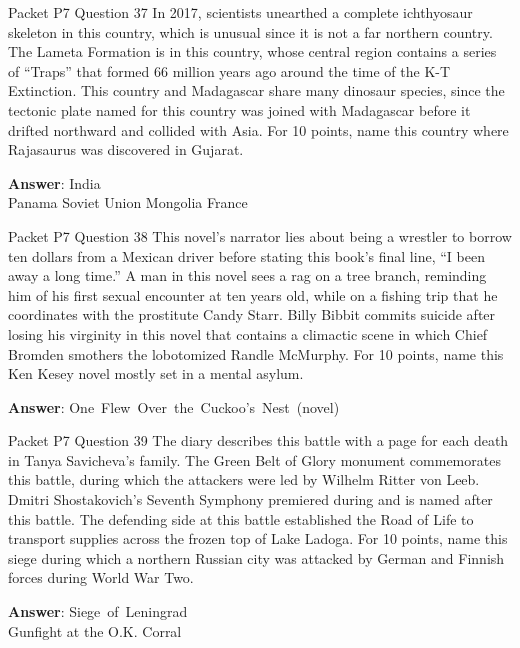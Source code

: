 \begin{frame}{Packet P7 Question 37}
In 2017, scientists unearthed a complete ichthyosaur skeleton in this country, which is unusual since it is not a far northern country. The Lameta Formation is in this country, whose central region contains a series of “Traps” that formed 66 million years ago around the time of the K-T Extinction. This country and Madagascar share many dinosaur species, since the tectonic plate named for this country was joined with Madagascar before it drifted northward and collided with Asia. For 10 points, name this country where Rajasaurus was discovered in Gujarat.        

\textbf{Answer}: India\\
 Panama
 Soviet Union
 Mongolia
 France
\end{frame}

\begin{frame}{Packet P7 Question 38}
This novel’s narrator lies about being a wrestler to borrow ten dollars from a Mexican driver before stating this book’s final line, “I been away a long time.” A man in this novel sees a rag on a tree branch, reminding him of his first sexual encounter at ten years old, while on a fishing trip that he coordinates with the prostitute Candy Starr. Billy Bibbit commits       suicide after   losing his virginity in this novel that contains a climactic scene in which Chief Bromden smothers the lobotomized Randle McMurphy. For 10 points, name this Ken Kesey novel mostly set in a mental asylum.

\textbf{Answer}: One\ Flew\ Over\ the\ Cuckoo's\ Nest\ (novel)\\
\end{frame}

\begin{frame}{Packet P7 Question 39}
The diary describes this battle with a page for each death in Tanya Savicheva's family. The Green Belt of Glory monument commemorates this battle, during which the attackers were led   by Wilhelm Ritter von   Leeb. Dmitri Shostakovich's Seventh Symphony premiered during and is named after this battle. The   defending side at this battle established the Road of Life to transport supplies across the frozen   top of Lake Ladoga.   For 10 points, name this siege during which a northern Russian city was attacked by German and Finnish forces during World War Two.

\textbf{Answer}: Siege\ of\ Leningrad\\
 Gunfight at the O.K. Corral
\end{frame}

